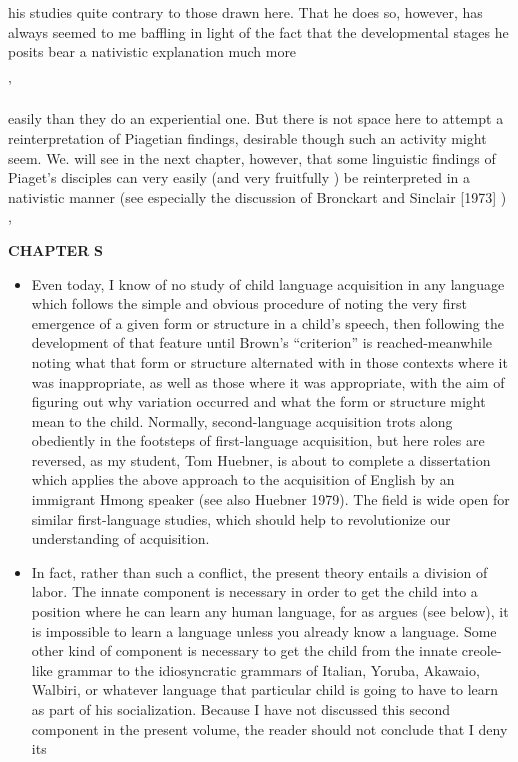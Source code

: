 \begin{itemize}
\begin{itemize}
\begin{itemize}
\begin{itemize}
his studies quite contrary to those drawn here. That he does so, how\-ever, has always seemed to me baffling in light of the fact that the developmental stages he posits bear a nativistic explanation much more

'


easily than they do an experiential one. But there is not space here to attempt a reinterpretation of Piagetian findings, desirable though such an activity might seem. We. will see in the next chapter, however, that some linguistic findings of Piaget's disciples can very easily (and very fruitfully ) be reinterpreted in a nativistic manner (see especially the discussion of Bronckart and Sinclair [1973] ) ,

\textbf{CHAPTER} \textbf{S}

\begin{itemize}
\item Even today, I know of no study of child language acquisition in any language which follows the simple and obvious procedure of noting the very first emergence of a given form or structure in a child's speech, then following the development of that feature until Brown's ``criterion'' is reached-meanwhile noting what that form or structure alternated with in those contexts where it was inappropriate, as well as those where it was appropriate, with the aim of figuring out why variation occurred and what the form or structure might mean to the child. Normally, second-language acquisition trots along obediently in the footsteps of first-language acquisition, but here roles are reversed, as my student, Tom Huebner, is about to complete a dissertation which applies the above approach to the acquisition of English by an immi\-grant Hmong speaker (see also Huebner 1979). The field is wide open for similar first-language studies, which should help to revolutionize our understanding of acquisition.
\item In fact, rather than such a conflict, the present theory entails a division of labor. The innate component is necessary in order to get the child into a position where he can learn any human language, for as \citet{Fodor1975} argues (see below), it is impossible to learn a language unless you already know a language. Some other kind of component is necessary to get the child from the innate creole-like grammar to the idiosyncratic grammars of Italian, Yoruba, Akawaio, Walbiri, or what\-ever language that particular child is going to have to learn as part of his socialization. Because I have not discussed this second component in the present volume, the reader should not conclude that I deny its
\end{itemize}


\end{itemize}
\end{itemize}
\end{itemize}
\end{itemize}
